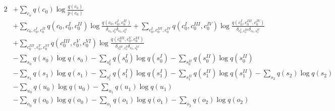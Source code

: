 \documentclass[fleqn]{article}
\begin{document}
\begin{alignat*}{2}
        & + \sum_{c_o} q(c_0) \log \frac{q(c_o)}{p(c_0)}                                                                                                                                                                             \\
        & + \sum_{c_0, c^{\scriptscriptstyle I}_0, c^{\scriptscriptstyle II}_0} q(c_0, c^{\scriptscriptstyle I}_0, c^{\scriptscriptstyle II}_0) \log \frac{q(c_0, c^{\scriptscriptstyle I}_0, c^{\scriptscriptstyle II}_0)}{\delta_{c_0, c^{\scriptscriptstyle I}_0} \delta_{c_0, s^{\scriptscriptstyle II}_0}} + \sum_{c^{\scriptscriptstyle I}_0, c^{\scriptscriptstyle III}_0, c^{\scriptscriptstyle IV}_0} q(c^{\scriptscriptstyle I}_0, c^{\scriptscriptstyle III}_0, c^{\scriptscriptstyle IV}_0) \log \frac{q(c^{\scriptscriptstyle I}_0, c^{\scriptscriptstyle III}_0, c^{\scriptscriptstyle IV}_0)}{\delta_{c^{\scriptscriptstyle I}_0, c^{\scriptscriptstyle III}_0} \delta_{c_0, s^{\scriptscriptstyle IV}_0}} \\
        & + \sum_{c^{\scriptscriptstyle III}_0, c^{\scriptscriptstyle V}_0, c^{\scriptscriptstyle VI}_0} q(c^{\scriptscriptstyle III}_0, c^{\scriptscriptstyle V}_0, c^{\scriptscriptstyle VI}_0) \log \frac{q(c^{\scriptscriptstyle III}_0, c^{\scriptscriptstyle V}_0, c^{\scriptscriptstyle VI}_0)}{\delta_{c^{\scriptscriptstyle III}_0, c^{\scriptscriptstyle V}_0} \delta_{c_0, s^{\scriptscriptstyle VI}_0}} \\
        & - \sum_{s_0} q(s_0) \log q(s_0) - \sum_{s^{\scriptscriptstyle I}_0} q(s^{\scriptscriptstyle I}_0) \log q(s^{\scriptscriptstyle I}_0) - \sum_{s^{\scriptscriptstyle II}_0} q(s^{\scriptscriptstyle II}_0) \log q(s^{\scriptscriptstyle II}_0) \\
        & - \sum_{s_1} q(s_1) \log q(s_1) - \sum_{s^{\scriptscriptstyle I}_1} q(s^{\scriptscriptstyle I}_1) \log q(s^{\scriptscriptstyle I}_1) - \sum_{s^{\scriptscriptstyle II}_1} q(s^{\scriptscriptstyle II}_1) \log q(s^{\scriptscriptstyle II}_1) - \sum_{s_2} q(s_2) \log q(s_2)                                                                                                                          \\
        & - \sum_{u_0} q(u_0) \log q(u_0) - \sum_{u_1} q(u_1) \log q(u_1)                                                                                                                                                            \\
        & - \sum_{o_0} q(o_0) \log q(o_0) - \sum_{o_1} q(o_1) \log q(o_1) - \sum_{o_2} q(o_2) \log q(o_2)                                                                                                                            \\

\end{alignat*}
\end{document}
